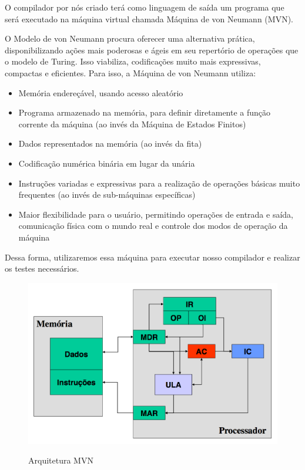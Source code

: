 
O compilador por nós criado terá como linguagem de saída um programa que será executado na máquina virtual chamada Máquina de von Neumann (MVN).

O Modelo de von Neumann procura oferecer uma alternativa prática, disponibilizando ações mais poderosas e ágeis em seu repertório de operações que o modelo de Turing. Isso viabiliza, codificações muito mais expressivas, compactas e eficientes. Para isso, a Máquina de von Neumann utiliza:

\begin{itemize}
	\item Memória endereçável, usando acesso aleatório
	\item Programa armazenado na memória, para definir diretamente a função corrente da máquina (ao invés da Máquina de Estados Finitos)
	\item Dados representados na memória (ao invés da fita)
	\item Codificação numérica binária em lugar da unária
	\item Instruções variadas e expressivas para a realização de operações básicas muito frequentes (ao invés de sub-máquinas específicas)
	\item Maior flexibilidade para o usuário, permitindo operações de entrada e saída, comunicação física com o mundo real e controle dos modos de operação da máquina 
\end{itemize}

Dessa forma, utilizaremos essa máquina para executar nosso compilador e realizar os testes necessários.

\begin{figure}[ht]
	\centering
	\caption{Arquitetura MVN}
	\includegraphics[width=\textwidth]{images/arquitetura-mvn.png}
	\label{fig:arquitetura-mvn}
\end{figure}

